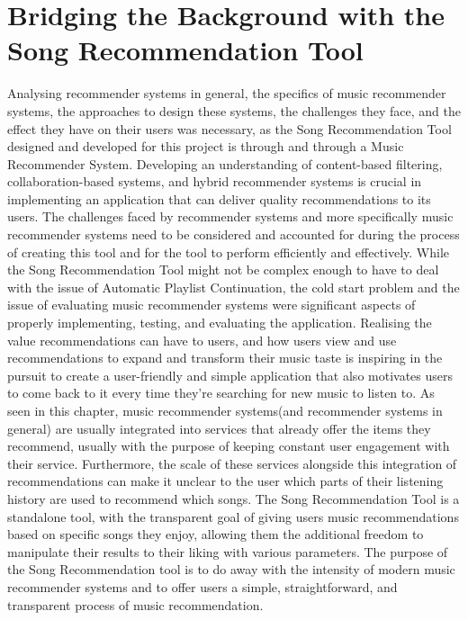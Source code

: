 \documentclass{l4proj}
\begin{document}
\section{Bridging the Background with the Song Recommendation Tool}
Analysing recommender systems in general, the specifics of music recommender systems, the approaches to design these systems, the challenges they face, and the effect they have on their users was necessary, as the Song Recommendation Tool designed and developed for this project is through and through a Music Recommender System. Developing an understanding of content-based filtering, collaboration-based systems, and hybrid recommender systems is crucial in implementing an application that can deliver quality recommendations to its users. The challenges faced by recommender systems and more specifically music recommender systems need to be considered and accounted for during the process of creating this tool and for the tool to perform efficiently and effectively. While the Song Recommendation Tool might not be complex enough to have to deal with the issue of Automatic Playlist Continuation, the cold start problem and the issue of evaluating music recommender systems were significant aspects of properly implementing, testing, and evaluating the application. Realising the value recommendations can have to users, and how users view and use recommendations to expand and transform their music taste is inspiring in the pursuit to create a user-friendly and simple application that also motivates users to come back to it every time they're searching for new music to listen to. As seen in this chapter, music recommender systems(and recommender systems in general) are usually integrated into services that already offer the items they recommend, usually with the purpose of keeping constant user engagement with their service. Furthermore, the scale of these services alongside this integration of recommendations can make it unclear to the user which parts of their listening history are used to recommend which songs. The Song Recommendation Tool is a standalone tool, with the transparent goal of giving users music recommendations based on specific songs they enjoy, allowing them the additional freedom to manipulate their results to their liking with various parameters. The purpose of the Song Recommendation tool is to do away with the intensity of modern music recommender systems and to offer users a simple, straightforward, and transparent process of music recommendation.

\end{document}
